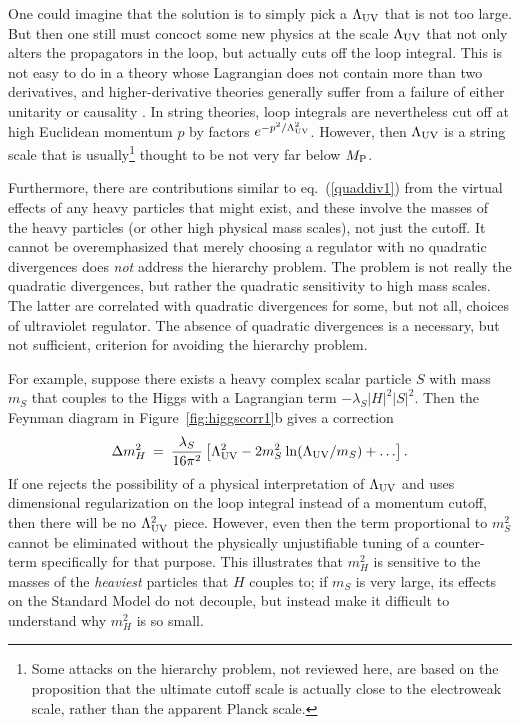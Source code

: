 \documentclass[11pt]{article}
\def\beq{\begin{eqnarray}}
\def\eeq{\end{eqnarray}}
\def\MPlanck{M_{\rm P}}
\begin{document}
One could imagine that the solution is to simply pick a $\Lambda_{\rm UV}$
that is not too large. But then one still must concoct some new physics at
the scale $\Lambda_{\rm UV}$ that not only alters the propagators in the
loop, but actually cuts off the loop integral. This is not easy to do in a
theory whose Lagrangian does not contain more than two derivatives, and
higher-derivative theories generally suffer from a failure of either
unitarity or causality \cite{EliezerWoodard}. In string theories, loop
integrals are nevertheless cut off at high Euclidean momentum $p$ by
factors $e^{-p^2/\Lambda^2_{\rm UV}}$.  However, then $\Lambda_{\rm UV}$
is a string scale that is usually\footnote{Some attacks on the
hierarchy problem, not reviewed here, 
are based on the proposition that the ultimate cutoff
scale is actually close to the electroweak scale, rather 
than the apparent Planck scale.} thought to
be not very far below $\MPlanck$. 

Furthermore, there are contributions similar to eq.~(\ref{quaddiv1}) from the virtual 
effects of any heavy particles that might exist, and these involve
the masses of the heavy particles (or other high physical mass scales), 
not just the cutoff. It cannot be overemphasized that merely choosing 
a regulator with no quadratic divergences does {\em not} address the hierarchy problem. 
The problem is not really the quadratic divergences, but rather the quadratic sensitivity 
to high mass scales. The latter are correlated with quadratic divergences for some, 
but not all, choices of ultraviolet regulator. The absence of quadratic divergences 
is a necessary, but not sufficient, criterion for avoiding the hierarchy problem.

For example, suppose there exists a heavy complex scalar particle $S$ with
mass $m_S$ that couples to the Higgs with a Lagrangian term $ -\lambda_S
|H|^2 |S|^2$. Then the Feynman diagram in Figure~\ref{fig:higgscorr1}b
gives a correction
\beq
\Delta m_H^2 \>=\> {\lambda_S\over 16 \pi^2}
\left [\Lambda_{\rm UV}^2 - 2 m_S^2
\> {\rm ln}(\Lambda_{\rm UV}/m_S) + \ldots
\right ].
\label{quaddiv2}
\eeq
If one rejects the possibility of a physical interpretation of
$\Lambda_{\rm UV}$ and uses dimensional regularization on the loop
integral instead of a momentum cutoff, then there will be no $\Lambda_{\rm
UV}^2$ piece. However, even then the term proportional to $m_S^2$ cannot
be eliminated without the physically unjustifiable tuning of a
counter-term specifically for that purpose. This illustrates that 
$m_H^2$ is sensitive to the
masses of the {\it heaviest} particles that $H$ couples to; if $m_S$ is
very large, its effects on the Standard Model do not decouple, but instead
make it difficult to understand why $m_H^2$ is so small. 
\end{document}
